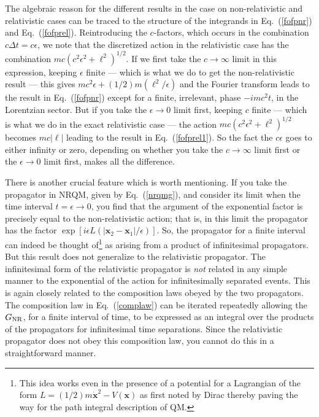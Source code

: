 \documentclass{article}
\def\eq#1{{Eq.~(\ref{#1})}}
\begin{document}
The algebraic reason for the different results in the case on non-relativistic and relativistic cases can be traced to the structure of the integrands in \eq{fofpnr} and \eq{fofprel}. Reintroducing the $c$-factors, which occurs in the combination $c\Delta t=c\epsilon$, we note that the discretized action in the relativistic case has the combination $mc(c^2\epsilon^2 +\bm{\ell}^2)^{1/2}$. If we first take the $c\to\infty$ limit in this expression, keeping  $\epsilon$ finite --- which is what we do to get the non-relativistic result --- this gives $mc^2\epsilon+(1/2)m(\bm{\ell}^2/\epsilon)$ and the Fourier transform leads to the result in \eq{fofpnr} except for a finite, irrelevant, phase $-imc^2t$, in the Lorentzian sector. But if you take the $\epsilon\to0$ limit first, keeping $c$ finite ---  which is what we do in the exact relativistic case ---  the action $mc(c^2\epsilon^2 +\bm{\ell}^2)^{1/2}$ becomes 
$mc|\bm{\ell}|$ leading to the result in \eq{fofprel1}. So the fact the $c\epsilon$ goes to either infinity or zero, depending on whether you take the $c\to\infty$ limit first or the $\epsilon\to0$ limit first, makes all the difference.

There is another crucial feature which is worth mentioning. If you take the propagator in NRQM, given by \eq{nrqmg},  and consider its limit when the time interval $t = \epsilon \to 0$, you find that the argument of the  exponential factor is precisely equal to the non-relativistic action; that is, in this limit the propagator has the factor $\exp[i\epsilon L(|\bm{x}_2 - \bm{x}_1|/\epsilon)]  $. So, the propagator for a finite interval can indeed be thought of\footnote{This idea works even in the presence of a potential for a Lagrangian of the form $L = (1/2)m\dot{\bm{x}}^2 - V(\bm{x})$ as first noted by Dirac thereby paving the way for the path integral description of QM.} as arising from a product of infinitesimal propagators. But this result does not generalize to the relativistic propagator. The infinitesimal form of the relativistic propagator is \textit{not} related in any simple manner to the exponential of the action for infinitesimally separated events. This is again closely related to the composition laws obeyed by the two propagators. The composition law in \eq{complaw} can be iterated repeatedly allowing the $G_{\rm NR}$, for a finite interval of time, to be expressed as an integral over the products of the propagators for infinitesimal time separations.  Since the relativistic propagator does not obey this composition law, you cannot do this in a straightforward manner. 
\end{document}
